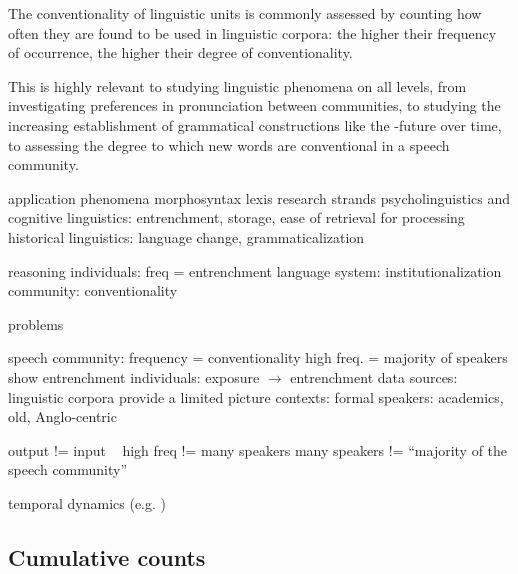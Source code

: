 \documentclass[a4paper]{scrartcl}
\begin{document}
  The conventionality of linguistic units is commonly assessed by counting how often they are found to be used in linguistic corpora: the higher their frequency of occurrence, the higher their degree of conventionality.

  This is highly relevant to studying linguistic phenomena on all levels, from investigating preferences in pronunciation between communities, to studying the increasing establishment of grammatical constructions like the -future over time, to assessing the degree to which new words are conventional in a speech community.


  application
    phenomena
      morphosyntax
      lexis
    research strands
      psycholinguistics and cognitive linguistics: entrenchment, storage, ease of retrieval for processing
      historical linguistics: language change, grammaticalization

  reasoning
    individuals: freq = entrenchment
    language system: institutionalization
    community: conventionality

  problems

    speech community: frequency = conventionality
      high freq. = majority of speakers show entrenchment
    individuals: exposure $\rightarrow$ entrenchment
    data sources: linguistic corpora provide a limited picture
        contexts: formal
        speakers: academics, old, Anglo-centric

    output != input ~\parencite{Stefanowitsch2017}
    high freq != many speakers
    many speakers != \enquote{majority of the speech community}

    temporal dynamics (e.g. )




  \subsection{Cumulative counts}
\end{document}
